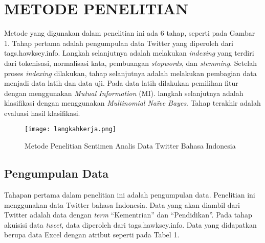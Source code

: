 \section*{METODE PENELITIAN}

Metode yang digunakan dalam penelitian ini ada 6 tahap,  seperti pada Gambar 1. Tahap pertama adalah pengumpulan data Twitter yang diperoleh dari tags.hawksey.info. Langkah selanjutnya adalah melakukan \textit{indexing} yang terdiri dari tokenisasi, normalisasi kata, pembuangan \textit{stopwords}, dan \textit{stemming}. Setelah proses \textit{indexing} dilakukan, tahap selanjutnya adalah melakukan pembagian data menjadi data latih dan data uji. Pada data latih dilakukan pemilihan fitur dengan menggunakan \textit{Mutual Information} (MI). langkah selanjutnya adalah klasifikasi dengan menggunakan \textit{Multinomial Naïve Bayes}. Tahap terakhir adalah evaluasi hasil klasifikasi. 

\begin{figure}[h!] %
\centering
\texttt{[image: langkahkerja.png]}
\caption{Metode Penelitian Sentimen Analis Data Twitter Bahasa Indonesia}
\label{fig:tahapan}
\end{figure}

\subsection*{Pengumpulan Data}

Tahapan pertama dalam  penelitian  ini adalah pengumpulan data. Penelitian ini menggunakan data Twitter bahasa Indonesia. Data yang akan diambil dari Twitter adalah data dengan \textit{term} “Kementrian” dan “Pendidikan”. Pada tahap akuisisi data \textit{tweet}, data diperoleh dari tags.hawksey.info. Data yang didapatkan berupa data Excel dengan atribut seperti pada Tabel 1.

